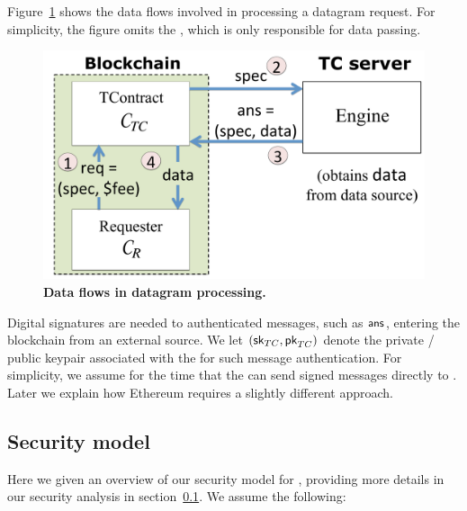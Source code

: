 Figure~\ref{fig:dataflow} shows the data flows involved in processing a datagram request. For simplicity, the figure omits the \medname, which is only responsible for data passing.


\begin{figure}[h!]
\centering
\includegraphics[width=\columnwidth]{figures/DataflowFig}
\caption{{\bf Data flows in datagram processing.}}
\label{fig:dataflow}
\end{figure}


Digital signatures are needed to authenticated messages, such as ${\sf ans}$, entering the blockchain from an external source. We let $({{\sf sk}_{TC}}, {\sf pk}_{TC})$ denote the private / public keypair associated with the \encname for such message authentication. For simplicity, we assume for the time that the \encname can send signed messages directly to \tcont. Later we explain how Ethereum requires a slightly different approach.

\subsection{Security model}

Here we given an overview of our security model for \tc, providing more details in our security analysis in section~\ref{}. We assume the following:

